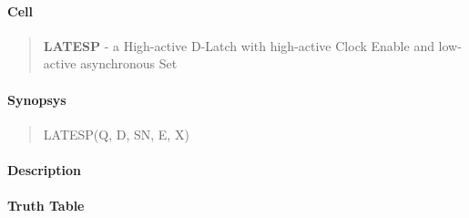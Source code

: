 \label{LATESP}
\paragraph{Cell}
\begin{quote}
    \textbf{LATESP} - a High-active D-Latch with high-active Clock Enable and low-active asynchronous Set
\end{quote}

\paragraph{Synopsys}
\begin{quote}
    LATESP(Q, D, SN, E, X)
\end{quote}

\paragraph{Description}

%

\paragraph{Truth Table}
%


